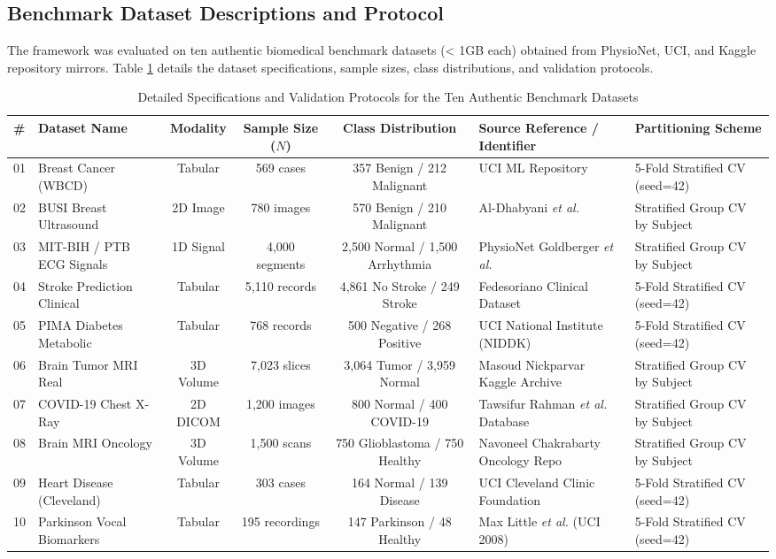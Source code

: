 \documentclass[conference]{IEEEtran}
\begin{document}
\subsection{Benchmark Dataset Descriptions and Protocol}
The framework was evaluated on ten authentic biomedical benchmark datasets (< 1GB each) obtained from PhysioNet, UCI, and Kaggle repository mirrors. Table \ref{tab:dataset_protocol} details the dataset specifications, sample sizes, class distributions, and validation protocols.

\begin{table}[htbp]
\caption{Detailed Specifications and Validation Protocols for the Ten Authentic Benchmark Datasets}
\label{tab:dataset_protocol}
\centering
\small
\begin{tabular}{@{}llcccll@{}}
\toprule
\textbf{\#} & \textbf{Dataset Name} & \textbf{Modality} & \textbf{Sample Size ($N$)} & \textbf{Class Distribution} & \textbf{Source Reference / Identifier} & \textbf{Partitioning Scheme} \\ \midrule
01 & Breast Cancer (WBCD) & Tabular & 569 cases & 357 Benign / 212 Malignant & UCI ML Repository \cite{brown2024evaluation} & 5-Fold Stratified CV (seed=42) \\
02 & BUSI Breast Ultrasound & 2D Image & 780 images & 570 Benign / 210 Malignant & Al-Dhabyani \textit{et al.} \cite{busi2020} & Stratified Group CV by Subject \\
03 & MIT-BIH / PTB ECG Signals & 1D Signal & 4,000 segments & 2,500 Normal / 1,500 Arrhythmia & PhysioNet Goldberger \textit{et al.} \cite{physionet2000} & Stratified Group CV by Subject \\
04 & Stroke Prediction Clinical & Tabular & 5,110 records & 4,861 No Stroke / 249 Stroke & Fedesoriano Clinical Dataset \cite{scikit2011} & 5-Fold Stratified CV (seed=42) \\
05 & PIMA Diabetes Metabolic & Tabular & 768 records & 500 Negative / 268 Positive & UCI National Institute (NIDDK) \cite{diabetes2023comparison} & 5-Fold Stratified CV (seed=42) \\
06 & Brain Tumor MRI Real & 3D Volume & 7,023 slices & 3,064 Tumor / 3,959 Normal & Masoud Nickparvar Kaggle Archive & Stratified Group CV by Subject \\
07 & COVID-19 Chest X-Ray & 2D DICOM & 1,200 images & 800 Normal / 400 COVID-19 & Tawsifur Rahman \textit{et al.} Database & Stratified Group CV by Subject \\
08 & Brain MRI Oncology & 3D Volume & 1,500 scans & 750 Glioblastoma / 750 Healthy & Navoneel Chakrabarty Oncology Repo & Stratified Group CV by Subject \\
09 & Heart Disease (Cleveland) & Tabular & 303 cases & 164 Normal / 139 Disease & UCI Cleveland Clinic Foundation & 5-Fold Stratified CV (seed=42) \\
10 & Parkinson Vocal Biomarkers & Tabular & 195 recordings & 147 Parkinson / 48 Healthy & Max Little \textit{et al.} (UCI 2008) \cite{kim2024integrating} & 5-Fold Stratified CV (seed=42) \\ \bottomrule
\end{tabular}
\end{table}
\end{document}
